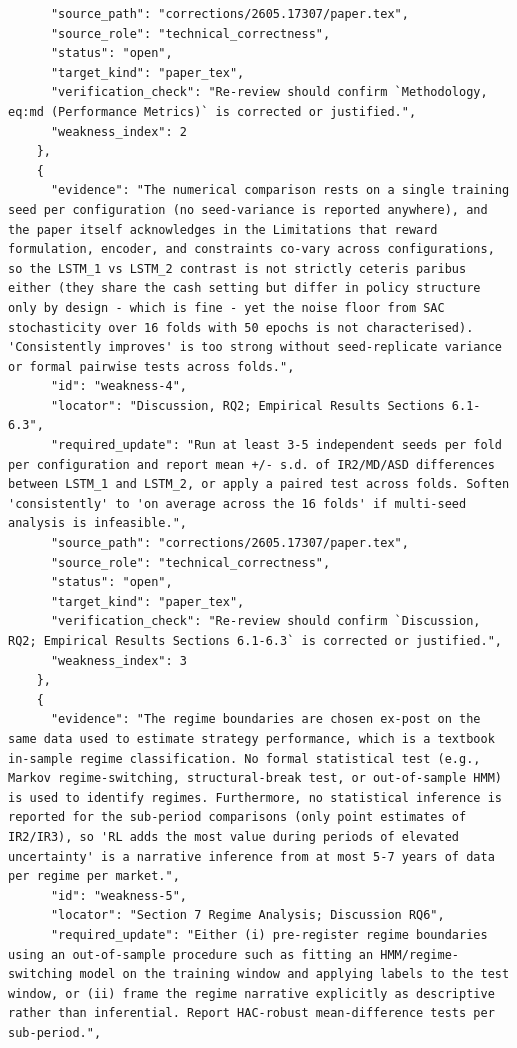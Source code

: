 \documentclass[11pt]{article}
\begin{document}
\begin{verbatim}
      "source_path": "corrections/2605.17307/paper.tex",
      "source_role": "technical_correctness",
      "status": "open",
      "target_kind": "paper_tex",
      "verification_check": "Re-review should confirm `Methodology, eq:md (Performance Metrics)` is corrected or justified.",
      "weakness_index": 2
    },
    {
      "evidence": "The numerical comparison rests on a single training seed per configuration (no seed-variance is reported anywhere), and the paper itself acknowledges in the Limitations that reward formulation, encoder, and constraints co-vary across configurations, so the LSTM_1 vs LSTM_2 contrast is not strictly ceteris paribus either (they share the cash setting but differ in policy structure only by design - which is fine - yet the noise floor from SAC stochasticity over 16 folds with 50 epochs is not characterised). 'Consistently improves' is too strong without seed-replicate variance or formal pairwise tests across folds.",
      "id": "weakness-4",
      "locator": "Discussion, RQ2; Empirical Results Sections 6.1-6.3",
      "required_update": "Run at least 3-5 independent seeds per fold per configuration and report mean +/- s.d. of IR2/MD/ASD differences between LSTM_1 and LSTM_2, or apply a paired test across folds. Soften 'consistently' to 'on average across the 16 folds' if multi-seed analysis is infeasible.",
      "source_path": "corrections/2605.17307/paper.tex",
      "source_role": "technical_correctness",
      "status": "open",
      "target_kind": "paper_tex",
      "verification_check": "Re-review should confirm `Discussion, RQ2; Empirical Results Sections 6.1-6.3` is corrected or justified.",
      "weakness_index": 3
    },
    {
      "evidence": "The regime boundaries are chosen ex-post on the same data used to estimate strategy performance, which is a textbook in-sample regime classification. No formal statistical test (e.g., Markov regime-switching, structural-break test, or out-of-sample HMM) is used to identify regimes. Furthermore, no statistical inference is reported for the sub-period comparisons (only point estimates of IR2/IR3), so 'RL adds the most value during periods of elevated uncertainty' is a narrative inference from at most 5-7 years of data per regime per market.",
      "id": "weakness-5",
      "locator": "Section 7 Regime Analysis; Discussion RQ6",
      "required_update": "Either (i) pre-register regime boundaries using an out-of-sample procedure such as fitting an HMM/regime-switching model on the training window and applying labels to the test window, or (ii) frame the regime narrative explicitly as descriptive rather than inferential. Report HAC-robust mean-difference tests per sub-period.",

\end{verbatim}
\end{document}
